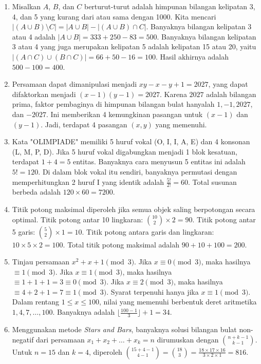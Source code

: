 \documentclass{article}
\begin{document}
\begin{enumerate}

\item Misalkan $A$, $B$, dan $C$ berturut-turut adalah himpunan bilangan kelipatan 3, 4, dan 5 yang kurang dari atau sama dengan 1000. Kita mencari $|(A \cup B) \setminus C| = |A \cup B| - |(A \cup B) \cap C|$. 
Banyaknya bilangan kelipatan 3 atau 4 adalah $|A \cup B| = 333 + 250 - 83 = 500$.
Banyaknya bilangan kelipatan 3 atau 4 yang juga merupakan kelipatan 5 adalah kelipatan 15 atau 20, yaitu $|(A \cap C) \cup (B \cap C)| = 66 + 50 - 16 = 100$. 
Hasil akhirnya adalah $500 - 100 = 400$.

\item Persamaan dapat dimanipulasi menjadi $xy - x - y + 1 = 2027$, yang dapat difaktorkan menjadi $(x-1)(y-1) = 2027$. Karena $2027$ adalah bilangan prima, faktor pembaginya di himpunan bilangan bulat hanyalah $1, -1, 2027$, dan $-2027$. Ini memberikan 4 kemungkinan pasangan untuk $(x-1)$ dan $(y-1)$. Jadi, terdapat 4 pasangan $(x,y)$ yang memenuhi.

\item Kata "OLIMPIADE" memiliki 5 huruf vokal (O, I, I, A, E) dan 4 konsonan (L, M, P, D). Jika 5 huruf vokal digabungkan menjadi 1 blok kesatuan, terdapat $1 + 4 = 5$ entitas. Banyaknya cara menyusun 5 entitas ini adalah $5! = 120$. Di dalam blok vokal itu sendiri, banyaknya permutasi dengan memperhitungkan 2 huruf I yang identik adalah $\frac{5!}{2!} = 60$. Total susunan berbeda adalah $120 \times 60 = 7200$.

\item Titik potong maksimal diperoleh jika semua objek saling berpotongan secara optimal. 
Titik potong antar 10 lingkaran: $\binom{10}{2} \times 2 = 90$. 
Titik potong antar 5 garis: $\binom{5}{2} \times 1 = 10$. 
Titik potong antara garis dan lingkaran: $10 \times 5 \times 2 = 100$. 
Total titik potong maksimal adalah $90 + 10 + 100 = 200$.

\item Tinjau persamaan $x^2 + x + 1 \pmod 3$. 
Jika $x \equiv 0 \pmod 3$, maka hasilnya $\equiv 1 \pmod 3$. 
Jika $x \equiv 1 \pmod 3$, maka hasilnya $\equiv 1+1+1 = 3 \equiv 0 \pmod 3$. 
Jika $x \equiv 2 \pmod 3$, maka hasilnya $\equiv 4+2+1 = 7 \equiv 1 \pmod 3$.
Syarat terpenuhi hanya jika $x \equiv 1 \pmod 3$. Dalam rentang $1 \le x \le 100$, nilai yang memenuhi berbentuk deret aritmetika $1, 4, 7, \dots, 100$. Banyaknya adalah $\lfloor \frac{100-1}{3} \rfloor + 1 = 34$.

\item Menggunakan metode \textit{Stars and Bars}, banyaknya solusi bilangan bulat non-negatif dari persamaan $x_1 + x_2 + \dots + x_k = n$ dirumuskan dengan $\binom{n+k-1}{k-1}$. Untuk $n=15$ dan $k=4$, diperoleh $\binom{15+4-1}{4-1} = \binom{18}{3} = \frac{18 \times 17 \times 16}{3 \times 2 \times 1} = 816$.


\end{enumerate}
\end{document}
